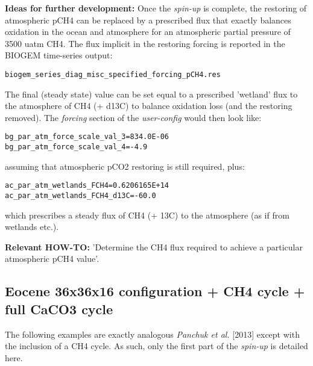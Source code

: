 \documentclass[10pt,twoside]{article}
\begin{document}
\noindent \textbf{Ideas for further development:} Once the \textit{spin-up} is complete, the restoring of atmospheric pCH4 can be replaced by a prescribed flux that exactly balances oxidation in the ocean and atmosphere for an atmospheric partial pressure of 3500 uatm CH4. The flux implicit in the restoring forcing is reported in the BIOGEM time-series output: 
\vspace{-10pt}\begin{verbatim}biogem_series_diag_misc_specified_forcing_pCH4.res\end{verbatim}\vspace{-10pt}
The final (steady state) value can be set equal to a prescribed 'wetland' flux to the atmosphere of CH4 (+ d13C) to balance oxidation loss (and the restoring removed). The \textit{forcing} section of the \textit{user-config} would then look like:
        \vspace{-10pt}\begin{verbatim}
bg_par_atm_force_scale_val_3=834.0E-06
bg_par_atm_force_scale_val_4=-4.9
                \end{verbatim}\vspace{-10pt}
assuming that atmospheric pCO2 restoring is still required, plus:
        \vspace{-10pt}\begin{verbatim}
ac_par_atm_wetlands_FCH4=0.6206165E+14
ac_par_atm_wetlands_FCH4_d13C=-60.0
                \end{verbatim}\vspace{-10pt}
which prescribes  a steady flux of CH4 (+ 13C) to the atmosphere (as if from wetlands etc.).

\noindent \textbf{Relevant HOW-TO:} 'Determine the CH4 flux required to achieve a particular atmospheric pCH4 value'.


\subsection{Eocene 36x36x16 configuration + CH4 cycle + full CaCO3 cycle}\label{EXAMPLE.p0055c.PO4CH4_S36x36.SPIN}

The following examples are exactly analogous \textit{Panchuk et al.} [2013] except with the inclusion of a CH4 cycle. As such, only the first part of the \textit{spin-up} is detailed here.
\end{document}
